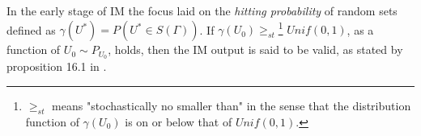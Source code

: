 \documentclass[
]{report}
\theoremstyle{definition}
\theoremstyle{definition}
\begin{document}
In the early stage of IM the focus laid on the
\textit{hitting probability} of random sets defined as
\(\gamma(U^*) = P(U^* \in S(\Gamma))\). If
\(\gamma(U_0) \geq_{st}\)\footnote{$\geq_{st}$ means "stochastically no smaller than" in the sense that the distribution function of $\gamma (U_0)$ is on or below that of $Unif(0,1)$.}
\(Unif(0,1)\), as a function of \(U_0 \sim P_{U_0}\), holds, then the IM
output is said to be valid, as stated by proposition 16.1 in
\cite{berger_handbook_2024}.


\printbibliography
\end{document}
